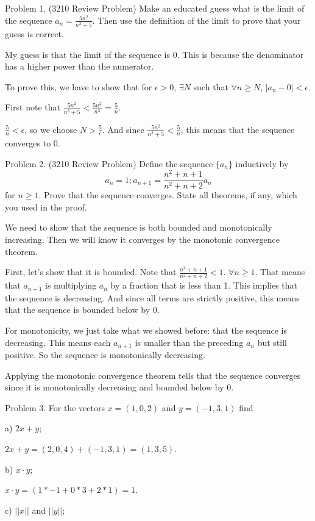 \documentclass{article}
\begin{document}
Problem 1. (3210 Review Problem) Make an educated guess what is the limit of the sequence
$a_n = \frac{5n^2}{n^3 + 5}$. Then use the definition of the limit to prove
that your guess is correct.

My guess is that the limit of the sequence is 0. This is because the denominator
has a higher power than the numerator.

To prove this, we have to show that for $\epsilon > 0$, $\exists N$ such that
$\forall n \geq N$, $|a_n - 0| < \epsilon$.

First note that $\frac{5n^2}{n^3 + 5} < \frac{5n^2}{n^3} = \frac{5}{n}$.

$\frac{5}{n} < \epsilon$, so we choose $N > \frac{5}{\epsilon}$. And since
$\frac{5n^2}{n^3 + 5} < \frac{5}{n}$,
this means that the sequence converges to 0.


Problem 2. (3210 Review Problem) Define the sequence $\{a_n\}$ inductively by
\[a_n = 1; a_{n+1} = \frac{n^2 + n + 1}{n^2 + n + 2} a_n\]
for $n \geq 1$. Prove that the sequence converges. State all theorems, if any,
which you used in the proof.

We need to show that the sequence is both bounded and monotonically
increasing. Then we will know it converges by the monotonic convergence theorem.

First, let's show that it is bounded. Note that $\frac{n^2 + n + 1}{n^2 + n + 2} < 1$.
$\forall n \geq 1$. That means that $a_{n+1}$ is multiplying $a_n$ by a fraction that is
less than 1. This implies that the sequence is decreasing. And since all terms
are strictly positive, this means that the sequence is bounded below by 0.

For monotonicity, we just take what we showed before: that the sequence is decreasing.
This means each $a_{n+1}$ is smaller than the preceding $a_n$ but still positive.
So the sequence is monotonically decreasing.

Applying the monotonic convergence theorem tells that the sequence converges
since it is monotonically decreasing and bounded below by 0.


Problem 3. For the vectors $x = (1, 0, 2)$ and $y = (-1, 3, 1)$ find

a) $2x + y$;

$2x+y = (2, 0, 4) + (-1, 3, 1) = (1, 3, 5)$.

b) $x \cdot y$;

$x \cdot y = (1*-1 + 0*3 + 2*1) = 1$.

c) $||x||$ and $||y||$;
\end{document}
